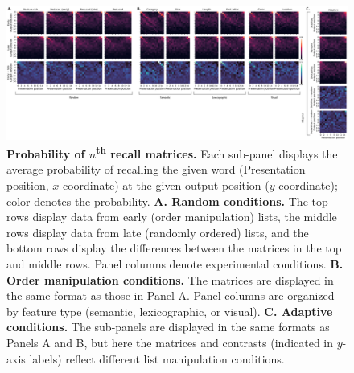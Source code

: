\documentclass{article}
\begin{document}
\begin{figure}
    \includegraphics[width=\textwidth]{figures/pnr_matrices}

    \caption{\textbf{Probability of $n$\textsuperscript{th} recall matrices.}  Each sub-panel displays
    the average probability of recalling the given word (Presentation position, $x$-coordinate)
    at the given output position ($y$-coordinate); color denotes the probability.  \textbf{A. Random conditions.}  The top rows
    display data from early (order manipulation) lists, the middle rows display data from late (randomly ordered)
    lists, and the bottom rows display the differences between the matrices in the top and middle rows.  Panel columns denote experimental conditions.
    \textbf{B. Order manipulation conditions.}  The matrices are displayed in the same format as those in Panel A.
    Panel columns are organized by feature type (semantic, lexicographic, or visual).  \textbf{C. Adaptive conditions.}
    The sub-panels are displayed in the same formats as Panels A and B, but here the matrices
    and contrasts (indicated in $y$-axis labels) reflect different list manipulation conditions.}

    \label{fig:pnr}
\end{figure}

\newpage
\renewcommand{\refname}{Supplementary references}


\end{document}
